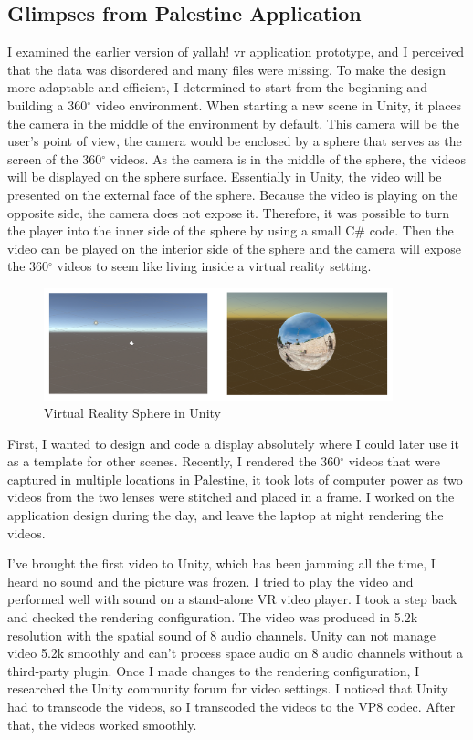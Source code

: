 \subsection{Glimpses from Palestine Application}

 I examined the earlier version of \acrshort{yallah!} \acrshort{vr} application prototype, and I perceived that the data was disordered and many files were missing. To make the design more adaptable and efficient, I determined to start from the beginning and building a 360$^{\circ}$ video environment. When starting a new scene in Unity, it places the camera in the middle of the environment by default. This camera will be the user’s point of view, the camera would be enclosed by a sphere that serves as the screen of the 360$^{\circ}$ videos. As the camera is in the middle of the sphere, the videos will be displayed on the sphere surface. Essentially in Unity, the video will be presented on the external face of the sphere. Because the video is playing on the opposite side, the camera does not expose it. Therefore, it was possible to turn the player into the inner side of the sphere by using a small C\# code. Then the video can be played on the interior side of the sphere and the camera will expose the 360$^{\circ}$ videos to seem like living inside a virtual reality setting.
\begin{figure}[ht]
    \centering
    \includegraphics[width=0.90\textwidth]{images/sphere.png}
    \caption{Virtual Reality Sphere in Unity }
    \label{fig:sphere}
\end{figure}


First, I wanted to design and code a display absolutely where I could later use it as a template for other scenes. Recently, I rendered the 360$^{\circ}$ videos that were captured in multiple locations in Palestine, it took lots of computer power as two videos from the two lenses were stitched and placed in a frame. I worked on the application design during the day, and leave the laptop at night rendering the videos.

I've brought the first video to Unity, which has been jamming all the time, I heard no sound and the picture was frozen. I tried to play the video and performed well with sound on a stand-alone VR video player. I took a step back and checked the rendering configuration. The video was produced in 5.2k resolution with the spatial sound of 8 audio channels. Unity can not manage video 5.2k smoothly and can't process space audio on 8 audio channels without a third-party plugin. Once I made changes to the rendering configuration, I researched the Unity community forum for video settings. I noticed that Unity had to transcode the videos, so I transcoded the videos to the VP8 codec. After that, the videos worked smoothly.


